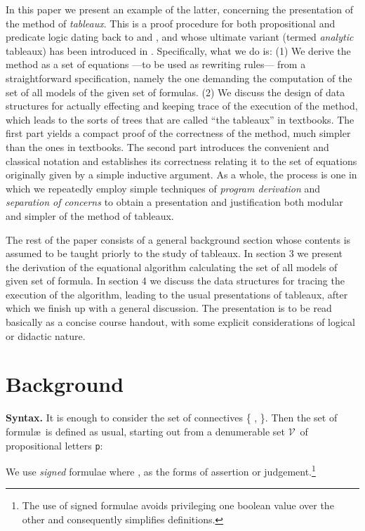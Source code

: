 \documentclass[a4paper,UKenglish]{lipics}
\newcounter{c}
\newcommand{\nentry}[1]{\noindent\textbf{#1}}
\newcommand{\lett}[1]{\texttt{#1}}
\newcommand{\vars}{\ensuremath{\mathcal{V}}}
\begin{document}
In this paper we present an example of the latter, concerning the presentation of the method of \textit{tableaux}.
This is a proof procedure for both propositional and predicate logic dating back to \cite{Hintikka} and \cite{Beth}, and whose ultimate variant (termed \textit{analytic} tableaux) has been introduced in \cite{Smullyan}. 
Specifically, what we do is: (1) We derive the method as a set of equations ---to be used as rewriting rules--- from a straightforward specification, namely the one demanding the computation of the set of all models of the given set of formulas.
(2) We discuss the design of data structures for actually effecting and keeping trace of the execution of the method, which leads to the sorts of trees that are called ``the tableaux'' in textbooks.
The first part yields a compact proof of the correctness of the method, much simpler than the ones in textbooks.
The second part introduces the convenient and classical notation and establishes its correctness relating it to the set of equations originally given by a simple inductive argument. 
As a whole, the process is one in which we repeatedly employ simple techniques of \emph{program derivation} and \emph{separation of concerns} to obtain a presentation and justification both modular and simpler of the method of tableaux. 


The rest of the paper consists of a general background section whose contents is assumed to be taught priorly to the study of tableaux. In section 3 we present the derivation of the equational algorithm calculating the set of all models of given set of formula. In section 4 we discuss the data structures for tracing the execution of the algorithm, leading to the usual presentations of tableaux, after which we finish up with a general discussion. The presentation is to be read basically as a concise course handout, with some explicit considerations of logical or didactic nature. 
\section{Background} 

\nentry{Syntax.} It is enough to consider the set of connectives \{ , \}. Then the set of formul\ae\ is defined as usual, starting out from a denumerable set \vars\ of propositional letters \lett{p}:




\noindent We use \textit{signed} formulae
 where , as the forms of assertion or judgement.\footnote{The use of signed formulae avoids privileging one boolean value over the other and consequently simplifies definitions.}
\end{document}
